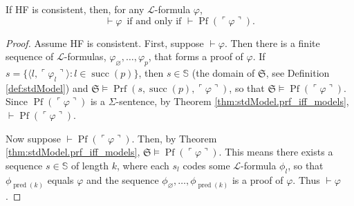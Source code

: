 \begin{theorem}
    \label{thm:prf_iff_prf_Pf_code}
    If HF is consistent, then, for any $\mathcal{L}$-formula $\varphi$,
    $$
    \vdash \varphi \,\text{ if and only if } \vdash \operatorname{Pf}(\ulcorner{\varphi}\urcorner).
    $$
\end{theorem}

\begin{proof}
    Assume HF is consistent. First, suppose $\vdash \varphi$.
    Then there is a finite sequence of $\mathcal{L}$-formulas, $\varphi_{\varnothing}, \ldots, 
    \varphi_p$, that forms a proof of $\varphi$.
    If $s = \{\langle l, \ulcorner{\varphi_l}\urcorner \rangle : l \in \operatorname{succ}(p) \}$,
    then $s \in \mathbb{S}$ (the domain of $\mathfrak{S}$, see Definition \ref{def:stdModel}) and
    $\mathfrak{S} \vDash \operatorname{Prf}(s, \operatorname{succ}(p), 
    \ulcorner{\varphi}\urcorner)$, 
    so that $\mathfrak{S} \vDash \operatorname{Pf}(\ulcorner{\varphi}\urcorner)$.
    Since $\operatorname{Pf}(\ulcorner{\varphi}\urcorner)$ is a $\Sigma$-sentence,
    by Theorem \ref{thm:stdModel.prf_iff_models}, 
    $\vdash \operatorname{Pf}(\ulcorner{\varphi}\urcorner)$.
    
    Now suppose $\vdash \operatorname{Pf}(\ulcorner{\varphi}\urcorner)$.
    Then, by Theorem \ref{thm:stdModel.prf_iff_models}, 
    $\mathfrak{S} \vDash \operatorname{Pf}(\ulcorner{\varphi}\urcorner)$.
    This means there exists a sequence $s \in \mathbb{S}$ of length $k$,
    where each $s_l$ codes some $\mathcal{L}$-formula $\phi_l$, 
    so that $\phi_{\operatorname{pred}(k)}$ equals $\varphi$ and the sequence
    $\phi_{\varnothing}, \ldots, \phi_{\operatorname{pred}(k)}$ is a proof of $\varphi$.
    Thus $\vdash \varphi$.
\end{proof}